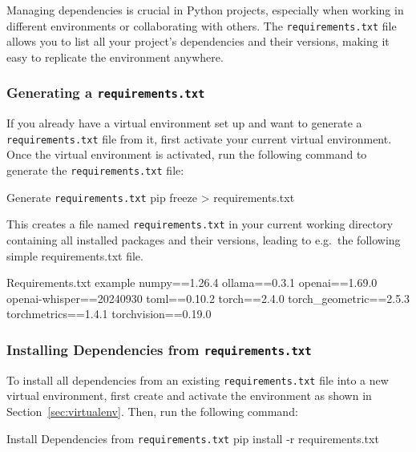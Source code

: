 Managing dependencies is crucial in Python projects, especially when working in different environments or collaborating with others. The \texttt{requirements.txt} file allows you to list all your project’s dependencies and their versions, making it easy to replicate the environment anywhere.

%
\subsubsection{Generating a \texttt{requirements.txt}}

If you already have a virtual environment set up and want to generate a \texttt{requirements.txt} file from it, first activate your current virtual environment. Once the virtual environment is activated, run the following command to generate the \texttt{requirements.txt} file:

\begin{codeonly}{Generate \texttt{requirements.txt}}
pip freeze > requirements.txt
\end{codeonly}

This creates a file named \texttt{requirements.txt} in your current working directory containing all installed packages and their versions, leading to e.g.\ the following simple requirements.txt file. 

\begin{codeonly}{Requirements.txt example}
numpy==1.26.4
ollama==0.3.1
openai==1.69.0
openai-whisper==20240930
toml==0.10.2
torch==2.4.0
torch_geometric==2.5.3
torchmetrics==1.4.1
torchvision==0.19.0
\end{codeonly}

%
\subsubsection{Installing Dependencies from \texttt{requirements.txt}}

To install all dependencies from an existing \texttt{requirements.txt} file into a new virtual environment, first create and activate the environment as shown in Section~\ref{sec:virtualenv}. Then, run the following command:

\begin{codeonly}{Install Dependencies from \texttt{requirements.txt}}
pip install -r requirements.txt
\end{codeonly}


